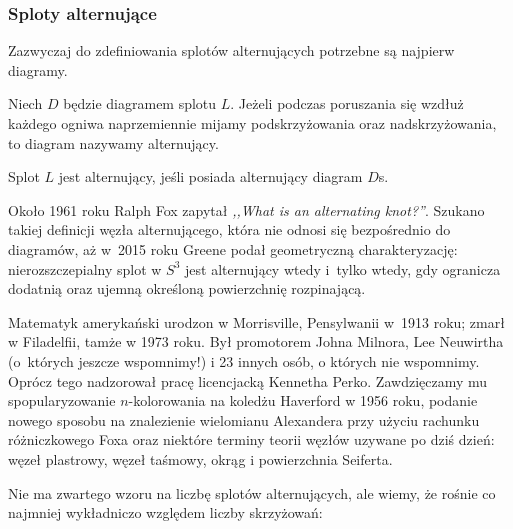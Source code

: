 
\subsubsection{Sploty alternujące}

Zazwyczaj do zdefiniowania splotów alternujących potrzebne są najpierw diagramy.

\begin{definition}
\label{def:alternating_link}%
%
    Niech $D$ będzie diagramem splotu $L$.
    Jeżeli podczas poruszania się wzdłuż każdego ogniwa naprzemiennie mijamy podskrzyżowania oraz nadskrzyżowania, to diagram nazywamy alternujący.
    
    Splot $L$ jest alternujący, jeśli posiada alternujący diagram $D$s.
\end{definition}

Około 1961 roku Ralph Fox zapytał \emph{,,What is an alternating knot?''}.
%
Szukano takiej definicji węzła alternującego, która nie odnosi się bezpośrednio do diagramów, aż w~2015 roku Greene \cite{greene2017} podał geometryczną charakteryzację: nierozszczepialny splot w $S^3$ jest alternujący wtedy i~tylko wtedy, gdy ogranicza dodatnią oraz ujemną określoną powierzchnię rozpinającą.
%

\begin{remark}
    Matematyk amerykański urodzon w Morrisville, Pensylwanii w~1913 roku; zmarł w Filadelfii, tamże w 1973 roku.
    Był promotorem Johna Milnora, Lee Neuwirtha (o~których jeszcze wspomnimy!) i 23 innych osób, o których nie wspomnimy.
    Oprócz tego nadzorował pracę licencjacką Kennetha Perko.
    Zawdzięczamy mu spopularyzowanie $n$-kolorowania na koledżu Haverford w 1956 roku, podanie nowego sposobu na znalezienie wielomianu Alexandera przy użyciu rachunku różniczkowego Foxa oraz niektóre terminy teorii węzłów uzywane po dziś dzień: węzeł plastrowy, węzeł taśmowy, okrąg i powierzchnia Seiferta.
\end{remark}

Nie ma zwartego wzoru na liczbę splotów alternujących, ale wiemy, że rośnie co najmniej wykładniczo względem liczby skrzyżowań:

